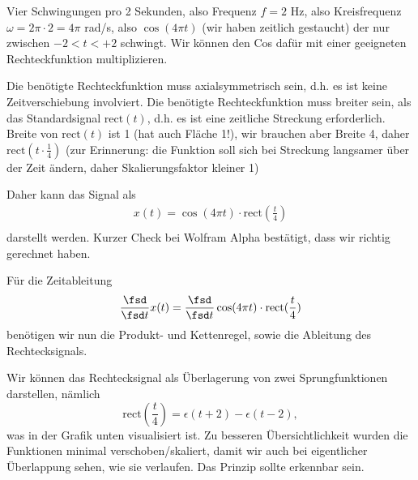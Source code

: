 \begin{ExCalc}
Vier Schwingungen pro 2 Sekunden, also Frequenz $f=2$ Hz, also Kreisfrequenz
$\omega=2\pi\cdot 2 = 4\pi$ rad/s, also $\cos(4\pi t)$ (wir haben zeitlich gestaucht)
der nur zwischen $-2 < t < +2$ schwingt. Wir können den Cos dafür mit einer
geeigneten Rechteckfunktion multiplizieren.

Die benötigte Rechteckfunktion muss axialsymmetrisch sein, d.h. es ist keine
Zeitverschiebung involviert.
Die benötigte Rechteckfunktion muss breiter sein, als das Standardsignal
$\mathrm{rect}(t)$, d.h. es ist eine zeitliche Streckung erforderlich.
Breite von $\mathrm{rect}(t)$ ist 1 (hat auch Fläche 1!), wir brauchen aber
Breite 4, daher $\mathrm{rect}(t\cdot \frac{1}{4})$ (zur Erinnerung:
die Funktion soll sich bei Streckung langsamer über der Zeit ändern, daher
Skalierungsfaktor kleiner 1)

Daher kann das Signal als
\begin{align}
x(t) = \cos(4\pi t) \cdot \mathrm{rect}(\frac{t}{4})\\
\end{align}
darstellt werden. Kurzer Check bei Wolfram Alpha bestätigt, dass wir richtig
gerechnet haben.

Für die Zeitableitung
\begin{align}
\frac{\fsd }{\fsd t} x(t) =
\frac{\fsd }{\fsd t} \cos(4\pi t) \cdot \mathrm{rect}(\frac{t}{4})\\
\end{align}
benötigen wir nun die Produkt- und Kettenregel, sowie die Ableitung des Rechtecksignals.

Wir können das Rechtecksignal als Überlagerung von zwei Sprungfunktionen darstellen,
nämlich
\begin{equation}
\mathrm{rect}(\frac{t}{4}) = \epsilon(t+2) -\epsilon(t-2),
\end{equation}
was in der Grafik unten visualisiert ist. Zu besseren Übersichtlichkeit wurden die
Funktionen minimal verschoben/skaliert, damit wir auch bei eigentlicher
Überlappung sehen, wie sie verlaufen. Das Prinzip sollte erkennbar sein.
%
\begin{center}
\end{center}


\end{ExCalc}
